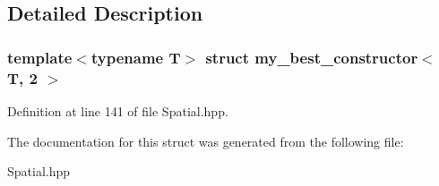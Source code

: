 \subsection{Detailed Description}
\subsubsection*{template$<$typename T$>$\newline
struct my\+\_\+best\+\_\+constructor$<$ T, 2 $>$}



Definition at line 141 of file Spatial.\+hpp.



The documentation for this struct was generated from the following file\+:\begin{DoxyCompactItemize}
\item 
Spatial.\+hpp\end{DoxyCompactItemize}
